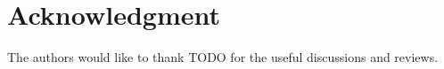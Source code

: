 \documentclass[conference]{IEEEtran}
\begin{document}


\section*{Acknowledgment}
The authors would like to thank TODO for the useful discussions and reviews.






%
%
%




\end{document}
